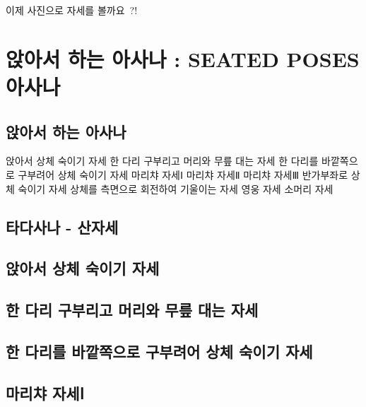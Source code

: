 \documentclass[12pt, a4paper, oneside]{book}
\let\stdsection\section
\renewcommand\section{\newpage\stdsection}
\begin{document}
	
	
	이제 사진으로 자세를 볼까요~?!
	
	

	\chapter{앉아서 하는 아사나 : SEATED POSES 아사나}
	\newpage
	\minitoc


		\section{앉아서 하는 아사나 }

	앉아서 상체 숙이기 자세
	한 다리 구부리고 머리와 무릎 대는 자세
	한 다리를 바깥쪽으로 구부려어 상체 숙이기 자세
	마리챠 자세Ⅰ
	마리챠 자세Ⅱ
	마리챠 자세Ⅲ
	반가부좌로 상체 숙이기 자세
	상체를 측면으로 회전하여 기울이는 자세
	영웅 자세
	소머리 자세

		\section{타다사나 - 산자세}


		\section{	앉아서 상체 숙이기 자세}
		\section{	한 다리 구부리고 머리와 무릎 대는 자세}
		\section{	한 다리를 바깥쪽으로 구부려어 상체 숙이기 자세}
		\section{	마리챠 자세Ⅰ}
\end{document}
